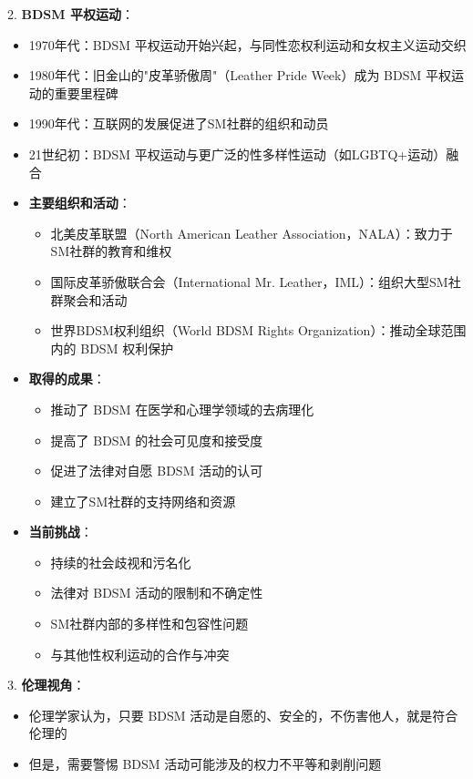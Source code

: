 \documentclass[12pt,UTF8]{ctexbook}
\begin{document}
2. \textbf{BDSM 平权运动}：
  \begin{itemize}
    \item 1970年代：BDSM 平权运动开始兴起，与同性恋权利运动和女权主义运动交织
    \item 1980年代：旧金山的"皮革骄傲周"（Leather Pride Week）成为 BDSM 平权运动的重要里程碑
    \item 1990年代：互联网的发展促进了SM社群的组织和动员
    \item 21世纪初：BDSM 平权运动与更广泛的性多样性运动（如LGBTQ+运动）融合
  \item \textbf{主要组织和活动}：
    \begin{itemize}
    \item 北美皮革联盟（North American Leather Association，NALA）：致力于SM社群的教育和维权
    \item 国际皮革骄傲联合会（International Mr. Leather，IML）：组织大型SM社群聚会和活动
    \item 世界BDSM权利组织（World BDSM Rights Organization）：推动全球范围内的 BDSM 权利保护
    \end{itemize}
  \item \textbf{取得的成果}：
    \begin{itemize}
    \item 推动了 BDSM 在医学和心理学领域的去病理化
    \item 提高了 BDSM 的社会可见度和接受度
    \item 促进了法律对自愿 BDSM 活动的认可
    \item 建立了SM社群的支持网络和资源
    \end{itemize}
  \item \textbf{当前挑战}：
    \begin{itemize}
    \item 持续的社会歧视和污名化
    \item 法律对 BDSM 活动的限制和不确定性
    \item SM社群内部的多样性和包容性问题
    \item 与其他性权利运动的合作与冲突
    \end{itemize}
  \end{itemize}

3. \textbf{伦理视角}：
  \begin{itemize}
  \item 伦理学家认为，只要 BDSM 活动是自愿的、安全的，不伤害他人，就是符合伦理的
  \item 但是，需要警惕 BDSM 活动可能涉及的权力不平等和剥削问题
  \end{itemize}
\end{document}
